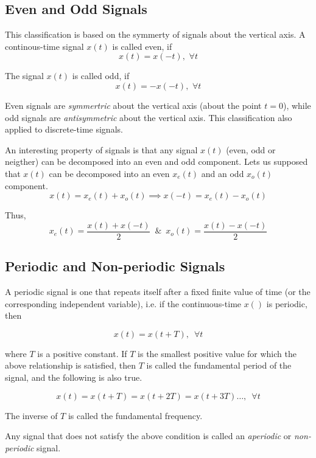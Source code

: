 \subsection{Even and Odd Signals}
This classification is based on the symmerty of signals about the vertical axis. A continous-time signal $x\left(t\right)$ is called even, if 
\[ x\left(t\right) = x\left(-t\right), \,\, \forall t \]

The signal $x\left(t\right)$ is called odd, if
\[ x\left(t\right) = -x\left(-t\right), \,\, \forall t \]

Even signals are \textit{symmertric} about the vertical axis (about the point $t = 0$), while odd signals are \textit{antisymmetric} about the vertical axis. This classification also applied to discrete-time signals.

An interesting property of signals is that any signal $x\left(t\right)$ (even, odd or neigther) can be decomposed into an even and odd component. Lets us supposed that $x\left(t\right)$ can be decomposed into an even $x_{e}\left(t\right)$ and an odd $x_{o}\left(t\right)$ component.
\[ x\left(t\right) = x_{e}\left(t\right) + x_{o}\left(t\right) \implies x\left(-t\right) = x_{e}\left(t\right) - x_{o}\left(t\right) \]

Thus,
\[ x_{e}\left(t\right) = \frac{x\left(t\right) + x\left(-t\right)}{2} \,\,\, \& \,\,\, x_{o}\left(t\right) = \frac{x\left(t\right) - x\left(-t\right)}{2} \]

\subsection{Periodic and Non-periodic Signals}
A periodic signal is one that repeats itself after a fixed finite value of time (or the corresponding independent variable), i.e. if the continuous-time $x\left(\right)$ is periodic, then

\[ x\left(t\right) = x\left(t + T\right), \,\,\, \forall t \]

where $T$ is a positive constant. If $T$ is the smallest positive value for which the above relationship is satisfied, then $T$ is called the fundamental period of the signal, and the following is also true.

\[ x\left(t\right) = x\left(t + T\right) = x\left(t + 2T\right)  = x\left(t + 3T\right) \dotsc , \,\,\, \forall t \]

The inverse of $T$ is called the fundamental frequency.

Any signal that does not satisfy the above condition is called an \textit{aperiodic} or \textit{non-periodic} signal.

